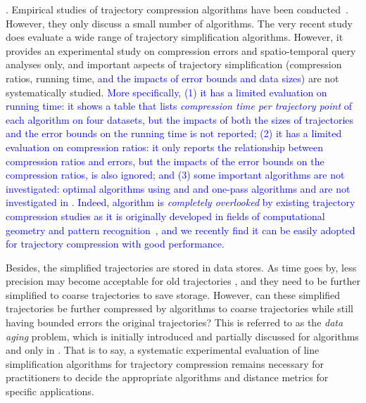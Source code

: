 {. Empirical studies of trajectory compression algorithms have been conducted~\cite{Muckell:Compression,MuckellHLR10,mThesis}. However, they only discuss a small number of algorithms. 
%
The very recent study \cite{Zhang:Evaluation} does evaluate a wide range of trajectory simplification algorithms.
However, it provides {an experimental study} on compression errors and spatio-temporal query analyses only, and important aspects of trajectory simplification (compression ratios, running time, \textcolor{blue}{and the impacts of error bounds and data sizes}) are not systematically studied. 
\textcolor{blue}{More specifically, }
\textcolor{blue}{(1) it has a limited evaluation on running time: it shows a table that lists \emph{compression time per trajectory point} of each algorithm on four datasets, but the impacts of both the sizes of trajectories and the error bounds on the running time is not reported;}
%
\textcolor{blue}{(2) it has a limited evaluation on compression ratios: it only reports the relationship between compression ratios and errors, but the impacts of the error bounds on the compression ratios, is also ignored; and }
%
\textcolor{blue}{(3) some important algorithms are not investigated: optimal algorithms using \ped and \sed and one-pass algorithms \siped and \cised are not investigated in \cite{Zhang:Evaluation}. Indeed, algorithm \siped is {\em completely overlooked} by existing trajectory compression studies as it is originally developed in fields of computational geometry and pattern recognition~\cite{Williams:Longest,Sklansky:Cone,Dunham:Cone, Zhao:Sleeve}, and we recently find it can be easily adopted for trajectory compression with good performance.}%

Besides, the simplified trajectories are stored in data stores. As time goes by, less precision may become acceptable for old trajectories \cite{Cao:Spatio}, and they need to be further simplified to coarse trajectories to save storage. However, can these simplified trajectories be further compressed by \lsa algorithms to coarse trajectories while still having bounded errors \wrt the original trajectories? This is referred to as the \emph{data aging} problem, which is initially introduced and partially discussed for algorithms \opt and \dpa only in \cite{Cao:Spatio}.
That is to say, a systematic experimental evaluation of line simplification algorithms for trajectory compression remains necessary for practitioners to decide the appropriate algorithms and distance metrics for specific applications.


}
